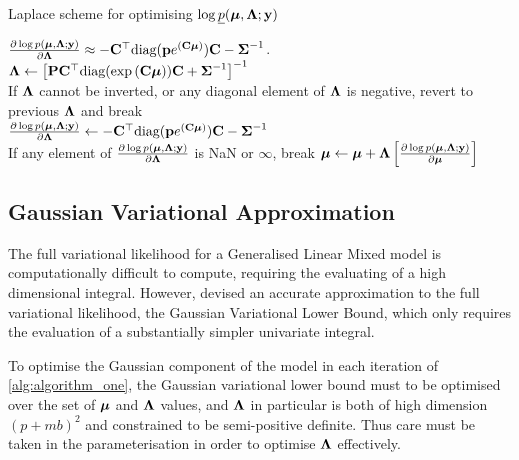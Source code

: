 \documentclass{amsart}[12pt]
\begin{document}
			\begin{algorithm}
				\caption{Laplace scheme for optimising $\log \underline{p}({\boldsymbol \mu}, {\boldsymbol \Lambda}; {\bf y})$}
				\label{alg:laplace_alg}
				\begin{algorithmic}
					\REQUIRE $\frac{\partial \log p({\boldsymbol \mu}, {\boldsymbol \Lambda}; {\bf y})}{\partial {\boldsymbol\Lambda}} \approx - {\bf C}^\top \text{diag}({\bf p} e^{({\bf C} {\boldsymbol \mu})}) {\bf C} - {\boldsymbol \Sigma}^{-1}$.
					\STATE ${\boldsymbol \Lambda} \leftarrow \left [{\bf P} {\bf C}^\top \text{diag}(\exp{({\bf C}{\boldsymbol\mu})}) {\bf C} + {\boldsymbol \Sigma}^{-1} \right ]^{-1}$ \\ [1ex] 
					If ${\boldsymbol \Lambda}$ cannot be inverted, or any diagonal element of ${\boldsymbol \Lambda}$ is negative, revert to previous
					${\boldsymbol \Lambda}$ and break \\ [1ex]
					\STATE $\frac{\partial \log p({\boldsymbol \mu}, {\boldsymbol \Lambda}; {\bf y})}{\partial {\boldsymbol\Lambda}}
					\leftarrow - {\bf C}^\top \text{diag}({\bf p} e^{({\bf C} {\boldsymbol \mu})}) {\bf C} - {\boldsymbol \Sigma}^{-1}$ \\ [1ex]
					If any element of $\frac{\partial \log p({\boldsymbol \mu}, {\boldsymbol \Lambda}; {\bf y})}{\partial {\boldsymbol\Lambda}}$ is NaN or $\infty$,
					break
					\STATE ${\boldsymbol \mu} \leftarrow {\boldsymbol\mu} + {\boldsymbol \Lambda} \left [ \frac{\partial \log p({\boldsymbol \mu}, {\boldsymbol \Lambda}; {\bf y})}{\partial {\boldsymbol\mu}} \right ]$ \\ [1ex]
					\ENDWHILE
				\end{algorithmic}
			\end{algorithm}
					
			\subsection{Gaussian Variational Approximation}
					
					
			The full variational likelihood for a Generalised Linear Mixed model is computationally difficult to
			compute, requiring the evaluating of a high dimensional integral. However, \citep{Ormerod2012} devised
			an accurate approximation to the full variational likelihood, the Gaussian Variational Lower Bound,
			which only requires the evaluation of a substantially simpler univariate integral.
				
			To optimise the Gaussian component of the model in each iteration of \ref{alg:algorithm_one}, the Gaussian variational lower bound must to be optimised over the set of ${\boldsymbol \mu}$ and ${\boldsymbol \Lambda}$
			values, and ${\boldsymbol \Lambda}$ in particular is both of high dimension $(p + mb)^2$ and constrained to be
			semi-positive definite. Thus care must be taken in the parameterisation in order to optimise
			${\boldsymbol \Lambda}$ effectively.
				
\end{document}
